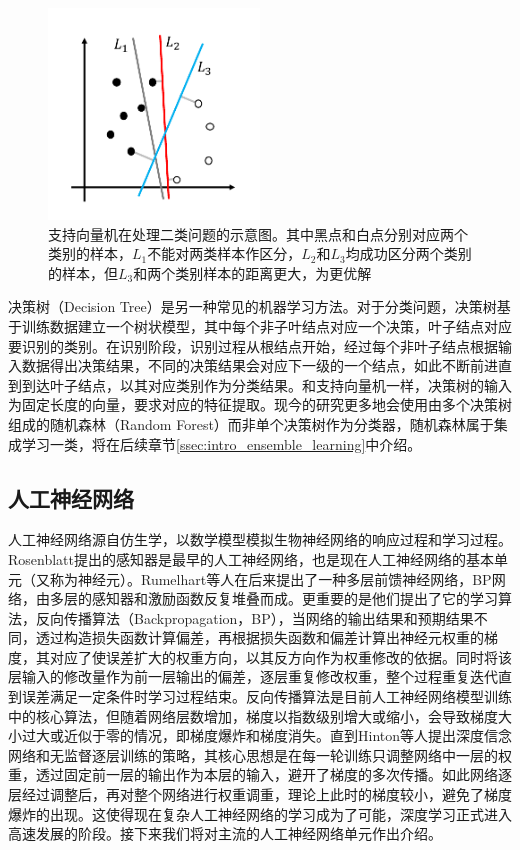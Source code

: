 \begin{figure}[H]
  \centering
  \includegraphics[width=0.5\textwidth]{img/svm.pdf}
  \caption{支持向量机在处理二类问题的示意图。其中黑点和白点分别对应两个类别的样本，$L_1$不能对两类样本作区分，$L_2$和$L_3$均成功区分两个类别的样本，但$L_3$和两个类别样本的距离更大，为更优解}
  \label{fig:svm}
\end{figure}

决策树（Decision Tree）是另一种常见的机器学习方法。对于分类问题，决策树基于训练数据建立一个树状模型，其中每个非子叶结点对应一个决策，叶子结点对应要识别的类别。在识别阶段，识别过程从根结点开始，经过每个非叶子结点根据输入数据得出决策结果，不同的决策结果会对应下一级的一个结点，如此不断前进直到到达叶子结点，以其对应类别作为分类结果。和支持向量机一样，决策树的输入为固定长度的向量，要求对应的特征提取。现今的研究更多地会使用由多个决策树组成的随机森林（Random Forest）而非单个决策树作为分类器，随机森林属于集成学习一类，将在后续章节\ref{ssec:intro_ensemble_learning}中介绍。

\subsection{人工神经网络}

人工神经网络源自仿生学，以数学模型模拟生物神经网络的响应过程和学习过程。Rosenblatt提出的感知器\cite{rosenblatt1958perceptron}是最早的人工神经网络，也是现在人工神经网络的基本单元（又称为神经元）。Rumelhart等人\cite{rumelhart1985learning}在后来提出了一种多层前馈神经网络，BP网络，由多层的感知器和激励函数反复堆叠而成。更重要的是他们提出了它的学习算法，反向传播算法（Backpropagation，BP），当网络的输出结果和预期结果不同，透过构造损失函数计算偏差，再根据损失函数和偏差计算出神经元权重的梯度，其对应了使误差扩大的权重方向，以其反方向作为权重修改的依据。同时将该层输入的修改量作为前一层输出的偏差，逐层重复修改权重，整个过程重复迭代直到误差满足一定条件时学习过程结束。反向传播算法是目前人工神经网络模型训练中的核心算法，但随着网络层数增加，梯度以指数级别增大或缩小，会导致梯度大小过大或近似于零的情况，即梯度爆炸和梯度消失。直到Hinton等人\cite{hinton2006fast}提出深度信念网络和无监督逐层训练的策略，其核心思想是在每一轮训练只调整网络中一层的权重，透过固定前一层的输出作为本层的输入，避开了梯度的多次传播。如此网络逐层经过调整后，再对整个网络进行权重调重，理论上此时的梯度较小，避免了梯度爆炸的出现。这使得现在复杂人工神经网络的学习成为了可能，深度学习正式进入高速发展的阶段。接下来我们将对主流的人工神经网络单元作出介绍。

